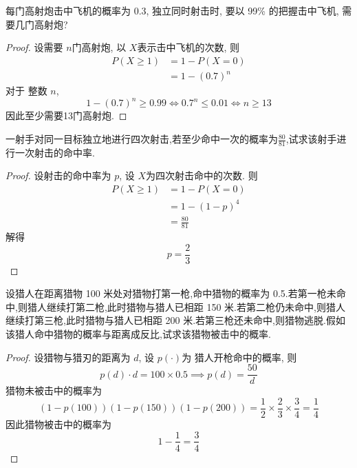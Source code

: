 \documentclass[../main.tex]{subfiles}
\begin{document}
\begin{exercise}{}{}
每门高射炮击中飞机的概率为 0.3, 独立同时射击时, 要以 99\% 的把握击中飞机, 需要几门高射炮?
\end{exercise}
\begin{proof}
    设需要 \(  n  \)门高射炮, 以 \(  X  \)表示击中飞机的次数, 则 \[
    \begin{aligned}
    P\left( X\ge 1 \right)&= 1-P\left( X= 0 \right)\\ 
     &= 1- \left( 0.7 \right)    ^{n}
    \end{aligned}
    \]对于 整数 \(  n  \), \[
    1-\left( 0.7 \right)^{n}\ge  0.99\iff 0.7^{n}\le  0.01\iff  n\ge 13
    \] 因此至少需要13门高射炮.
\end{proof}
\begin{exercise}{}{}
    一射手对同一目标独立地进行四次射击,若至少命中一次的概率为$\frac{80}{81}$,试求该射手进行一次射击的命中率.
\end{exercise}
\begin{proof}
    设射击的命中率为 \(  p  \), 设 \(  X  \)为四次射击命中的次数.  则 \[
    \begin{aligned}
    P\left( X\ge 1 \right)&= 1-P\left( X= 0 \right)\\ 
     &= 1-\left( 1-p \right)^{4}\\ 
      &= \frac{80 }{81 }     
    \end{aligned}
    \]解得 \[
    p= \frac{2 }{3 } 
    \]
\end{proof}
\begin{exercise}{}{}
设猎人在距离猎物 100 米处对猎物打第一枪,命中猎物的概率为 0.5.若第一枪未命中,则猎人继续打第二枪,此时猎物与猎人已相距 150 米.若第二枪仍未命中,则猎人继续打第三枪,此时猎物与猎人已相距 200 米.若第三枪还未命中,则猎物逃脱.假如该猎人命中猎物的概率与距离成反比,试求该猎物被击中的概率.
\end{exercise}
\begin{proof}
    设猎物与猎刃的距离为 \(  d  \), 设 \(  p\left( \cdot \right)   \)为  猎人开枪命中的概率, 则 \[
    p\left( d \right)\cdot d= 100\times 0.5\implies p\left( d \right)= \frac{50 }{d }   
    \]猎物未被击中的概率为 \[
    \left( 1-p\left( 100 \right)  \right)\left( 1-p\left( 150\right)  \right)\left( 1-p\left( 200 \right)  \right)   = \frac{1 }{2 }\times \frac{2 }{3 }\times \frac{3 }{4 }= \frac{1 }{4 }    
    \]因此猎物被击中的概率为 \[
    1-\frac{1 }{4 }= \frac{3 }{4 }  
    \]
\end{proof}
\end{document}
